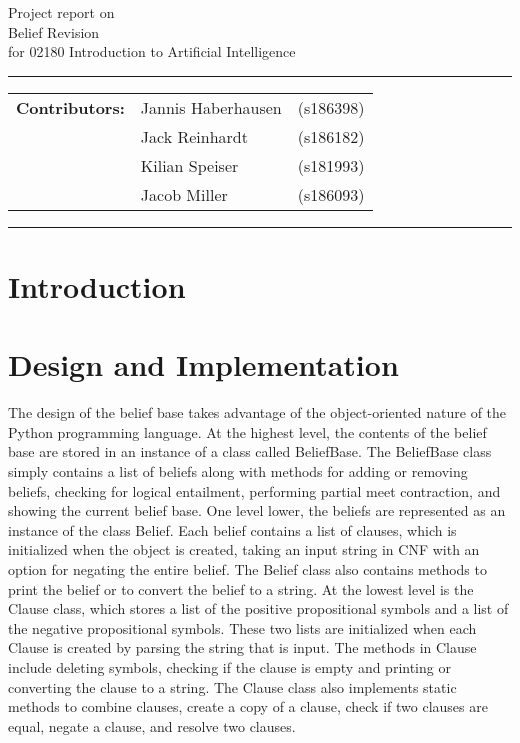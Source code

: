 \documentclass[a4paper,10pt]{article}
\begin{document}
\begin{center}
Project report on\\
\vspace{0.5cm}
{{\Large \sc Belief Revision}} \\
\vspace{0.5cm} for 02180 Introduction to Artificial Intelligence
\end{center}
\rule{\textwidth}{0.5pt}
\begin{description}
\item\begin{tabular}{rll}
    \textbf{Contributors:}  & Jannis Haberhausen  & (s186398) \\
                            & Jack Reinhardt      & (s186182) \\
                            & Kilian Speiser      & (s181993) \\
                            & Jacob Miller        & (s186093) \\
\end{tabular}
\end{description}
\rule{\textwidth}{1pt}

\tableofcontents
\newpage

\section{Introduction}
\label{sec:intro}


\section{Design and Implementation}
\label{sec:design}
The design of the belief base takes advantage of the object-oriented nature of the Python programming language. At the highest level, the contents of the belief base are stored in an instance of a class called BeliefBase. The BeliefBase class simply contains a list of beliefs along with methods for adding or removing beliefs, checking for logical entailment, performing partial meet contraction, and showing the current belief base. One level lower, the beliefs are represented as an instance of the class Belief. Each belief contains a list of clauses, which is initialized when the object is created, taking an input string in CNF with an option for negating the entire belief. The Belief class also contains methods to print the belief or to convert the belief to a string. At the lowest level is the Clause class, which stores a list of the positive propositional symbols and a list of the negative propositional symbols. These two lists are initialized when each Clause is created by parsing the string that is input. The methods in Clause include deleting symbols, checking if the clause is empty and printing or converting the clause to a string. The Clause class also implements static methods to combine clauses, create a copy of a clause, check if two clauses are equal, negate a clause, and resolve two clauses.
\end{document}
